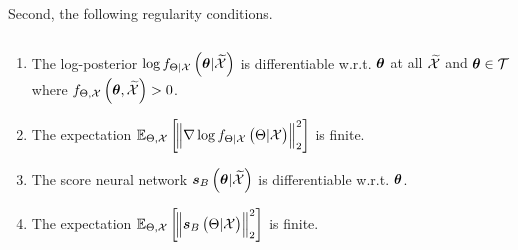 {%
Second, the following} regularity conditions. 
\begin{assumption}\label{ass:score_cond_reg}$\,$

\begin{enumerate}[label={\ref*{ass:score_cond_reg}}.\arabic*,labelsep=*, leftmargin=*]
\item \label{assum:diff_prob_post} The {log-posterior} $\log\probt{\p|\xsetr}{\pr|\xset}$ is differentiable w.r.t. $\p$ {at all $\xsetr$ and $\p\in\Ps$  where $\probt{\p,\xsetr}{\pr,\xset} > 0$}. 

\item The expectation $\expectation{\norm{\nabla\log\probt{\pr|\xset}{\pr|\xset}}_2^2}{\pr,\xset}$ is finite. \label{assum:bound_expection_post}
\item The score neural network $\postscore{\p}{\xsetr}$ is differentiable w.r.t. $\p$. \label{assum:net_cond_score}
\item The expectation $\expectation{\norm{\postscore{\pr}{\xset}}_2^2}{\pr,\xset}$  is finite. \label{assum:expected_cond_score}

\end{enumerate}
\end{assumption}
